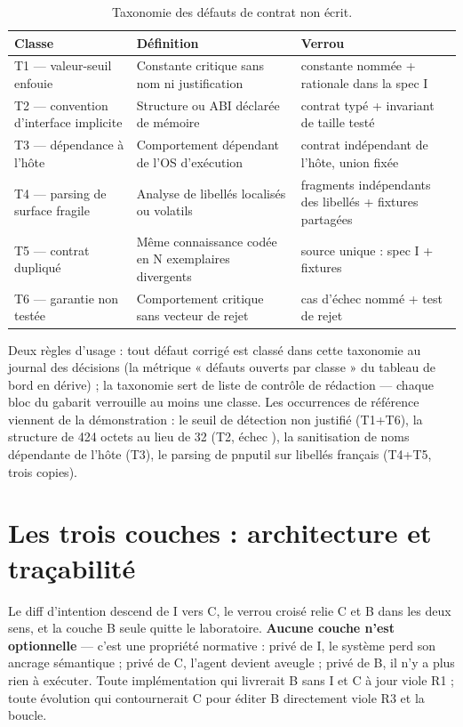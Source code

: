 \begin{table}[htbp]
\centering\small
\caption{Taxonomie des défauts de contrat non écrit.}
\label{tab:taxonomie}
\begin{tabularx}{\textwidth}{@{}l Y Y@{}}
\toprule
\textbf{Classe} & \textbf{Définition} & \textbf{Verrou} \\
\midrule
T1 — valeur-seuil enfouie & Constante critique sans nom ni justification & constante
nommée + rationale dans la spec I \\
T2 — convention d’interface implicite & Structure ou ABI déclarée de mémoire & contrat
typé + invariant de taille testé \\
T3 — dépendance à l’hôte & Comportement dépendant de l’OS d’exécution & contrat
indépendant de l’hôte, union fixée \\
T4 — parsing de surface fragile & Analyse de libellés localisés ou volatils & fragments
indépendants des libellés + fixtures partagées \\
T5 — contrat dupliqué & Même connaissance codée en N exemplaires divergents & source
unique : spec I + fixtures \\
T6 — garantie non testée & Comportement critique sans vecteur de rejet & cas d’échec
nommé + test de rejet \\
\bottomrule
\end{tabularx}
\end{table}

Deux règles d’usage : tout défaut corrigé est classé dans cette taxonomie au journal des
décisions (la métrique « défauts ouverts par classe » du tableau de bord en dérive) ; la
taxonomie sert de liste de contrôle de rédaction — chaque bloc du gabarit verrouille au
moins une classe. Les occurrences de référence viennent de la démonstration : le seuil de
détection non justifié (T1+T6), la structure  de 424 octets au
lieu de 32 (T2, échec ), la sanitisation de noms dépendante de l’hôte (T3), le
parsing de pnputil sur libellés français (T4+T5, trois copies).

\section{Les trois couches : architecture et traçabilité}\label{sec:couches}

Le diff d’intention descend de I vers C, le verrou croisé relie C et B dans les deux sens,
et la couche B seule quitte le laboratoire. \textbf{Aucune couche n’est optionnelle} —
c’est une propriété normative : privé de I, le système perd son ancrage sémantique ; privé
de C, l’agent devient aveugle ; privé de B, il n’y a plus rien à exécuter. Toute
implémentation qui livrerait B sans I et C à jour viole R1 ; toute évolution qui
contournerait C pour éditer B directement viole R3 et la boucle.


